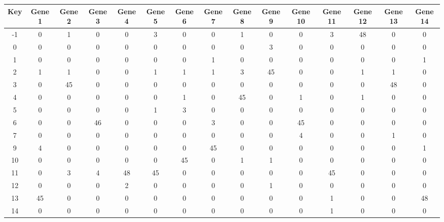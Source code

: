 \begin{tabular}{|c|c|c|c|c|c|c|c|c|c|c|c|c|c|c|}
\hline
Key & Gene 1 & Gene 2 & Gene 3 & Gene 4 & Gene 5 & Gene 6 & Gene 7 & Gene 8 & Gene 9 & Gene 10 & Gene 11 & Gene 12 & Gene 13 & Gene 14 \\
\hline
-1 & 0 & 1 & 0 & 0 & 3 & 0 & 0 & 1 & 0 & 0 & 3 & 48 & 0 & 0 \\
0 & 0 & 0 & 0 & 0 & 0 & 0 & 0 & 0 & 3 & 0 & 0 & 0 & 0 & 0 \\
1 & 0 & 0 & 0 & 0 & 0 & 0 & 1 & 0 & 0 & 0 & 0 & 0 & 0 & 1 \\
2 & 1 & 1 & 0 & 0 & 1 & 1 & 1 & 3 & 45 & 0 & 0 & 1 & 1 & 0 \\
3 & 0 & 45 & 0 & 0 & 0 & 0 & 0 & 0 & 0 & 0 & 0 & 0 & 48 & 0 \\
4 & 0 & 0 & 0 & 0 & 0 & 1 & 0 & 45 & 0 & 1 & 0 & 1 & 0 & 0 \\
5 & 0 & 0 & 0 & 0 & 1 & 3 & 0 & 0 & 0 & 0 & 0 & 0 & 0 & 0 \\
6 & 0 & 0 & 46 & 0 & 0 & 0 & 3 & 0 & 0 & 45 & 0 & 0 & 0 & 0 \\
7 & 0 & 0 & 0 & 0 & 0 & 0 & 0 & 0 & 0 & 4 & 0 & 0 & 1 & 0 \\
9 & 4 & 0 & 0 & 0 & 0 & 0 & 45 & 0 & 0 & 0 & 0 & 0 & 0 & 1 \\
10 & 0 & 0 & 0 & 0 & 0 & 45 & 0 & 1 & 1 & 0 & 0 & 0 & 0 & 0 \\
11 & 0 & 3 & 4 & 48 & 45 & 0 & 0 & 0 & 0 & 0 & 45 & 0 & 0 & 0 \\
12 & 0 & 0 & 0 & 2 & 0 & 0 & 0 & 0 & 1 & 0 & 0 & 0 & 0 & 0 \\
13 & 45 & 0 & 0 & 0 & 0 & 0 & 0 & 0 & 0 & 0 & 1 & 0 & 0 & 48 \\
14 & 0 & 0 & 0 & 0 & 0 & 0 & 0 & 0 & 0 & 0 & 1 & 0 & 0 & 0 \\
\hline
\end{tabular}